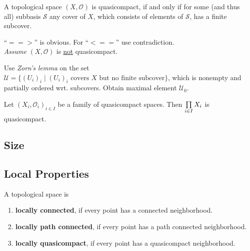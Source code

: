 \begin{theorem}
	A topological space $(X,\mathcal{O})$ is quasicompact, if and only if for some (and thus all) subbasis $\mathcal{S}$ any cover of $X$, which consists of elements of $\mathcal{S}$, has a finite subcover.
\end{theorem}

\begin{sketch}
	\enquote{$==>$} is obvious. For \enquote{$<==$} use contradiction.\\
	\textit{Assume} $(X,\mathcal{O})$ is \underline{not} quasicompact.
	\begin{tab}[1.3cm]
		Use \textit{Zorn's lemma} on the set $\mathcal{U} = \{(U_i)_i \mid (U_i)_i \text{ covers } X \text{ but no finite subcover}\}$, which is nonempty and partially ordered wrt. subcovers. Obtain maximal element $\mathcal{U}_0$. 
	\end{tab}
\end{sketch}

\begin{corollary}
	Let $(X_i, \mathcal{O}_i)_{i\in I}$ be a family of quasicompact spaces. Then $\prod \limits_{i \in I} X_i$ is quasicompact.
\end{corollary}


\newpage
\subsection{Size}

\subsection{Local Properties}
\begin{definition}
	A topological space is
	\begin{enumerate}[$\bullet$]
		\item{
			\textbf{locally connected}, if every point has a connected neighborhood.
		}
		\item{
			\textbf{locally path connected}, if every point has a path connected neighborhood.
		}
		\item{
			\textbf{locally quasicompact}, if every point has a quasicompact neighborhood.
		}
	\end{enumerate}
\end{definition}


